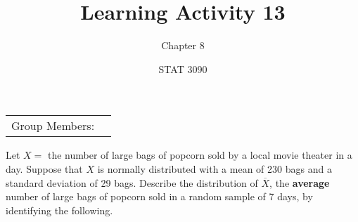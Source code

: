\documentclass[noanswers]{exam}
\title{Learning Activity 13}
\author{Chapter 8}
\date{STAT 3090}
\begin{document}
\noindent\begin{tabular}{@{}p{1.05in}p{5.5in}@{}}
Group Members: & \hrulefill
\end{tabular}

\vspace{3mm}

\begin{questions} 
		
	\question Let $X=$ the number of large bags of popcorn sold by a local movie theater in a day. Suppose that $X$ is normally distributed with a mean of 230 bags and a standard deviation of 29 bags. Describe the distribution of $\overline{X}$, the \textbf{average} number of large bags of popcorn sold in a random sample of 7 days, by identifying the following.
	
	\vspace{3mm}
	
\end{questions}
\end{document}
